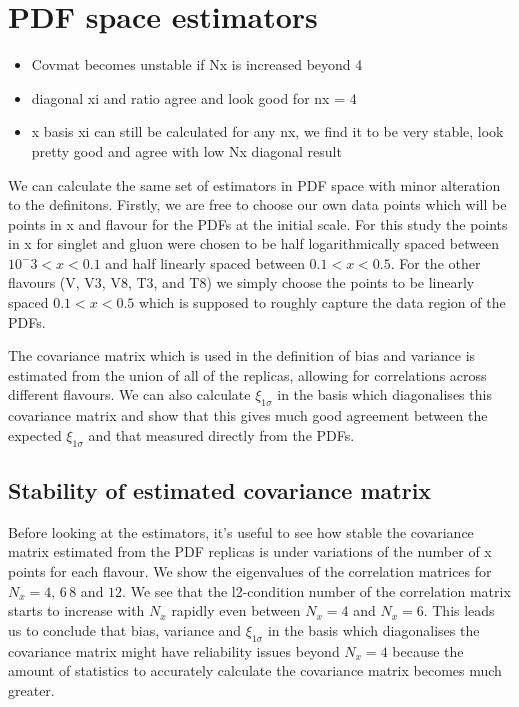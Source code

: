 \section{PDF space estimators}

\begin{itemize}
    \item Covmat becomes unstable if Nx is increased beyond 4
    \item diagonal xi and ratio agree and look good for nx = 4
    \item x basis xi can still be calculated for any nx, we find it to
        be very stable, look pretty good and agree with low Nx diagonal result
\end{itemize}

We can calculate the same set of estimators in PDF space with minor alteration
to the definitons. Firstly, we are free to choose our own data points which will
be points in x and flavour for the PDFs at the initial scale. For this study the
points in x for singlet and gluon were chosen to be half logarithmically spaced
between $10^-3<x<0.1$ and half linearly spaced between $0.1<x<0.5$. For the
other flavours (V, V3, V8, T3, and T8) we simply choose the points to be
linearly spaced $0.1<x<0.5$ which is supposed to roughly capture the data
region of the PDFs.

The covariance matrix which is used in the definition
of bias and variance is estimated from the union of all of the replicas, allowing
for correlations across different flavours. We can also calculate $\xi_{1\sigma}$
in the basis which diagonalises this covariance matrix and show that this gives
much good agreement between the expected $\xi_{1\sigma}$ and that measured
directly from the PDFs.

\subsection{Stability of estimated covariance matrix}

Before looking at the estimators, it's useful to see how stable the covariance
matrix estimated from the PDF replicas is under variations of the number of x
points for each flavour. We show the eigenvalues of the correlation matrices
for $N_x = 4,\,6\,8$ and $12$. We see that the l2-condition number of the
correlation matrix starts to increase with $N_x$ rapidly even between $N_x=4$
and $N_x=6$. This leads us to conclude that bias, variance and $\xi_{1\sigma}$
in the basis which diagonalises the covariance matrix might have reliability
issues beyond $N_x = 4$ because the amount of statistics to accurately
calculate the covariance matrix becomes much greater.

